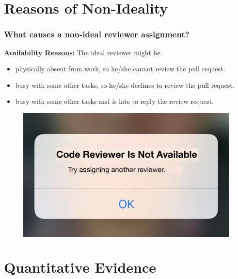 \documentclass{beamer}
\begin{document}
\section{Reasons of Non-Ideality}
\begin{frame}
\frametitle{\large What causes a non-ideal reviewer assignment?}
    \textbf{Availability Reasons:} \newline
    The ideal reviewer might be...
    \begin{itemize}
        \item  physically absent from work, so he/she cannot review the pull request. 
    \item  busy with some other tasks, so he/she declines to review the pull request.
    \item busy with some other tasks and is late to reply the review request.
    \end{itemize}
      \begin{figure}
      \includegraphics[scale=0.1]{img/reviewer_available.jpg}
      \end{figure}

\end{frame}

\section{Quantitative Evidence}
\end{document}
